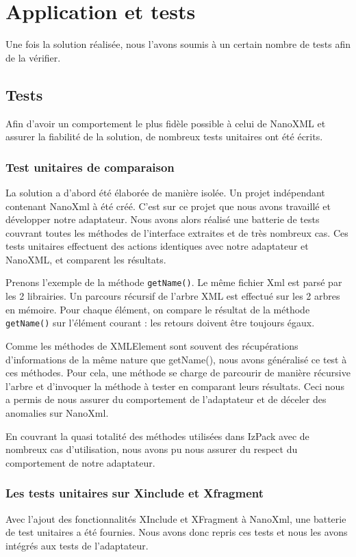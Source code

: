 \section{Application et tests}
Une fois la solution réalisée, nous l'avons soumis à un certain nombre de tests afin de la vérifier.
\subsection{Tests}
Afin d'avoir un comportement le plus fidèle possible à celui de NanoXML et assurer la fiabilité de la solution, de nombreux tests unitaires ont été écrits.
\subsubsection{Test unitaires de comparaison}
La solution a d'abord été élaborée de manière isolée.
Un projet indépendant contenant NanoXml à été créé. 
C'est sur ce projet que nous avons travaillé et développer notre adaptateur.
Nous avons alors réalisé une batterie de tests couvrant toutes les méthodes de l'interface extraites et de très nombreux cas.
Ces tests unitaires effectuent des actions identiques avec notre adaptateur et NanoXML, et comparent les résultats.

Prenons l'exemple de la méthode \verb|getName()|. Le même fichier Xml est parsé par les 2 librairies.
Un parcours récursif de l'arbre XML est effectué sur les 2 arbres en mémoire.
Pour chaque élément, on compare le résultat de la méthode \verb|getName()| sur l'élément courant : les retours doivent être toujours égaux.

Comme les méthodes de XMLElement sont souvent des récupérations d'informations de la même nature que getName(), nous avons généralisé ce test à ces méthodes.
Pour cela, une méthode se charge de parcourir de manière récursive l'arbre et d'invoquer la méthode à tester en comparant leurs résultats.
Ceci nous a permis de nous assurer du comportement de l'adaptateur et de déceler des anomalies sur NanoXml.

En couvrant la quasi totalité des méthodes utilisées dans IzPack avec de nombreux cas d'utilisation, nous avons pu nous assurer du respect du comportement de notre adaptateur.
\subsubsection{Les tests unitaires sur Xinclude et Xfragment}
Avec l'ajout des fonctionnalités XInclude et XFragment à NanoXml, une batterie de test unitaires a été fournies.
Nous avons donc repris ces tests et nous les avons intégrés aux tests de l'adaptateur.
